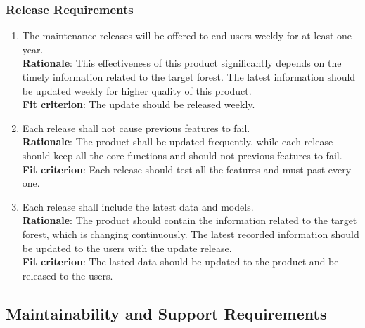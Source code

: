 \documentclass{article}
\begin{document}
\subsubsection{Release Requirements}
\begin{enumerate}[OE4.1]
    \item The maintenance releases will be offered to end users weekly for at least one year.\\
    \textbf{Rationale}: This effectiveness of this product significantly depends on the timely information related to the target forest. The latest information should be updated weekly for higher quality of this product.\\
    \textbf{Fit criterion}: The update should be released weekly.\\
    \item Each release shall not cause previous features to fail. \\
    \textbf{Rationale}: The product shall be updated frequently, while each release should keep all the core functions and should not previous features to fail.\\
    \textbf{Fit criterion}: Each release should test all the features and must past every one.\\
    \item Each release shall include the latest data and models. \\
    \textbf{Rationale}: The product should contain the information related to the target forest, which is changing continuously. The latest recorded information should be updated to the users with the update release.\\
    \textbf{Fit criterion}: The lasted data should be updated to the product and be released to the users. \\
\end{enumerate}
\subsection{Maintainability and Support Requirements}
\end{document}
